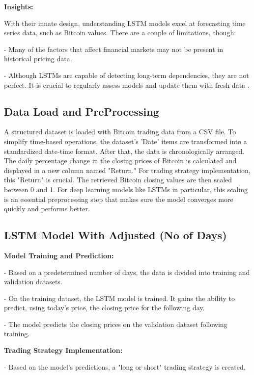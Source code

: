 \textbf{Insights:}

With their innate design, understanding LSTM models excel at forecasting time series data, such as Bitcoin values. There are a couple of limitations, though:

-	Many of the factors that affect financial markets may not be present in historical pricing data.

-	Although LSTMs are capable of detecting long-term dependencies, they are not perfect. It is crucial to regularly assess models and update them with fresh data \citep{moghar2020stock}.

\goodbreak



\subsection{Data Load and PreProcessing}

A structured dataset is loaded with Bitcoin trading data from a CSV file. To simplify time-based operations, the dataset's 'Date' items are transformed into a standardized date-time format. After that, the data is chronologically arranged. The daily percentage change in the closing prices of Bitcoin is calculated and displayed in a new column named "Return." For trading strategy implementation, this "Return" is crucial. The retrieved Bitcoin closing values are then scaled between 0 and 1. For deep learning models like LSTMs in particular, this scaling is an essential preprocessing step that makes sure the model converges more quickly and performs better.

\subsection{LSTM Model With Adjusted (No of Days)}

\textbf{Model Training and Prediction:}

- Based on a predetermined number of days, the data is divided into training and validation datasets.

- On the training dataset, the LSTM model is trained. It gains the ability to predict, using today's price, the closing price for the following day.

- The model predicts the closing prices on the validation dataset following training.

\textbf{Trading Strategy Implementation:}

- Based on the model's predictions, a "long or short" trading strategy is created.

